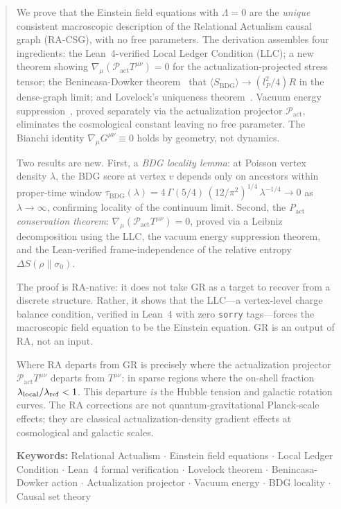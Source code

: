 \documentclass[11pt,a4paper]{article}
\newcommand{\Pact}{\mathcal{P}_{\mathrm{act}}}
\newcommand{\SBDG}{S_{\mathrm{BDG}}}
\begin{document}
\begin{abstract}
We prove that the Einstein field equations with $\Lambda = 0$ are the
\emph{unique} consistent macroscopic description of the Relational
Actualism causal graph (RA-CSG), with no free parameters.
The derivation assembles four ingredients: the Lean~4-verified
Local Ledger Condition (LLC); a new theorem showing
$\nabla_\mu(\Pact T^{\mu\nu}) = 0$ for the actualization-projected
stress tensor; the Benincasa-Dowker theorem~\citep{Benincasa2010} that
$\langle\SBDG\rangle \to (l_P^2/4)R$ in the dense-graph limit; and
Lovelock's uniqueness theorem~\citep{Lovelock1971}. Vacuum energy
suppression~\citep{Sandeman2026RAGC}, proved separately via the
actualization projector $\Pact$, eliminates the cosmological constant
leaving no free parameter. The Bianchi identity $\nabla_\mu G^{\mu\nu}
\equiv 0$ holds by geometry, not dynamics.

Two results are new. First, a \emph{BDG locality lemma}: at Poisson
vertex density $\lambda$, the BDG score at vertex $v$ depends only
on ancestors within proper-time window
$\tau_{\mathrm{BDG}}(\lambda) = 4\,\Gamma(5/4)\,(12/\pi^2)^{1/4}\,
\lambda^{-1/4} \to 0$ as $\lambda \to \infty$, confirming locality
of the continuum limit. Second, the \emph{P$_{\mathrm{act}}$
conservation theorem}: $\nabla_\mu(\Pact T^{\mu\nu}) = 0$, proved via
a Leibniz decomposition using the LLC, the vacuum energy suppression
theorem, and the Lean-verified frame-independence of the relative
entropy $\Delta S(\rho\|\sigma_0)$.

The proof is RA-native: it does not take GR as a target to recover
from a discrete structure. Rather, it shows that the LLC---a
vertex-level charge balance condition, verified in Lean~4 with zero
\texttt{sorry} tags---forces the macroscopic field equation to be
the Einstein equation. GR is an output of RA, not an input.

Where RA departs from GR is precisely where the actualization
projector $\Pact T^{\mu\nu}$ departs from $T^{\mu\nu}$: in sparse
regions where the on-shell fraction $\lambda_{\rm local}/\lambda_{\rm
ref} < 1$. This departure \emph{is} the Hubble tension and galactic
rotation curves. The RA corrections are not quantum-gravitational Planck-scale
effects; they are classical actualization-density gradient effects at
cosmological and galactic scales.

\medskip
\noindent\textbf{Keywords:} Relational Actualism $\cdot$
Einstein field equations $\cdot$ Local Ledger Condition $\cdot$
Lean~4 formal verification $\cdot$ Lovelock theorem $\cdot$
Benincasa-Dowker action $\cdot$ Actualization projector $\cdot$
Vacuum energy $\cdot$ BDG locality $\cdot$ Causal set theory
\end{abstract}
\end{document}
